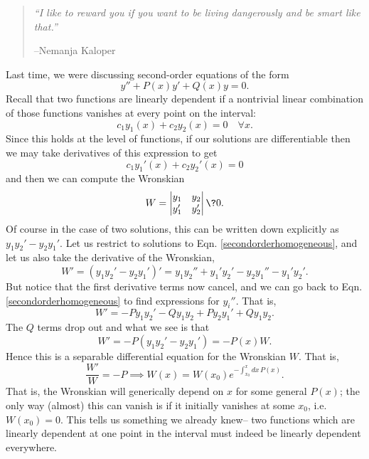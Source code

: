 \begin{quote}
    \textit{``I like to reward you if you want to be living dangerously and be smart like that.''}
    
    --Nemanja Kaloper
\end{quote}

Last time, we were discussing second-order equations of the form
\begin{equation}
    y'' + P(x) y' + Q(x) y =0.
\end{equation}
Recall that two functions are linearly dependent if a nontrivial linear combination of those functions vanishes at every point on the interval:
\begin{equation}\label{secondorderhomogeneous}
    c_1 y_1(x) +c_2 y_2(x) = 0 \quad\forall x.
\end{equation}
Since this holds at the level of functions, if our solutions are differentiable then we may take derivatives of this expression to get
\begin{equation}
    c_1 y_1'(x) + c_2 y_2'(x) = 0
\end{equation}
and then we can compute the Wronskian
\begin{equation}
    W= \begin{vmatrix}
    y_1 & y_2 \\
    y_1' & y_2'
    \end{vmatrix} \? 0.
\end{equation}
Of course in the case of two solutions, this can be written down explicitly as $y_1 y_2'-y_2 y_1'$. Let us restrict to solutions to Eqn. \ref{secondorderhomogeneous}, and let us also take the derivative of the Wronskian,
\begin{equation}
    W'= (y_1 y_2' - y_2 y_1')' = y_1 y_2'' + y_1' y_2' - y_2 y_1'' - y_1' y_2'.
\end{equation}
But notice that the first derivative terms now cancel, and we can go back to Eqn. \ref{secondorderhomogeneous} to find expressions for $y_i''$. That is,
\begin{equation}
    W' = -P y_1 y_2' - Q y_1 y_2 + P y_2 y_1' + Q y_1 y_2.
\end{equation}
The $Q$ terms drop out and what we see is that
\begin{equation}
    W'=-P(y_1y_2' - y_2y_1') = -P(x) W.
\end{equation}
Hence this is a separable differential equation for the Wronskian $W$. That is,
\begin{equation}
     \frac{W'}{W} = -P \implies W(x) = W(x_0)e^{-\int_{x_0}^x dx\,P(x)}.
\end{equation}
That is, the Wronskian will generically depend on $x$ for some general $P(x)$; the only way (almost) this can vanish is if it initially vanishes at some $x_0$, i.e. $W(x_0)=0$. This tells us something we already knew-- two functions which are linearly dependent at one point in the interval must indeed be linearly dependent everywhere.

